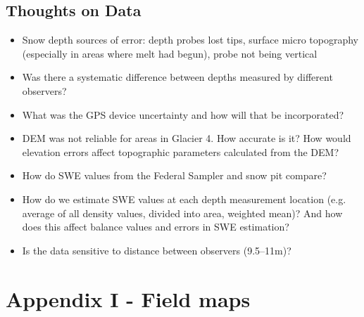 \documentclass[12pt]{article}
\begin{document}
\subsection{Thoughts on Data}

\begin{itemize}
\item Snow depth sources of error: depth probes lost tips, surface micro topography (especially in areas where melt had begun), probe not being vertical
\item Was there a systematic difference between depths measured by different observers?
\item What was the GPS device uncertainty and how will that be incorporated?
\item DEM was not reliable for areas in Glacier 4. How accurate is it? How would elevation errors affect topographic parameters calculated from the DEM?
\item How do SWE values from the Federal Sampler and snow pit compare?
\item How do we estimate SWE values at each depth measurement location (e.g. average of all density values, divided into area, weighted mean)? And how does this affect balance values and errors in SWE estimation? 
\item Is the data sensitive to distance between observers (9.5--11m)?
\end{itemize}




\pagebreak
\section*{Appendix I - Field maps}
\end{document}
